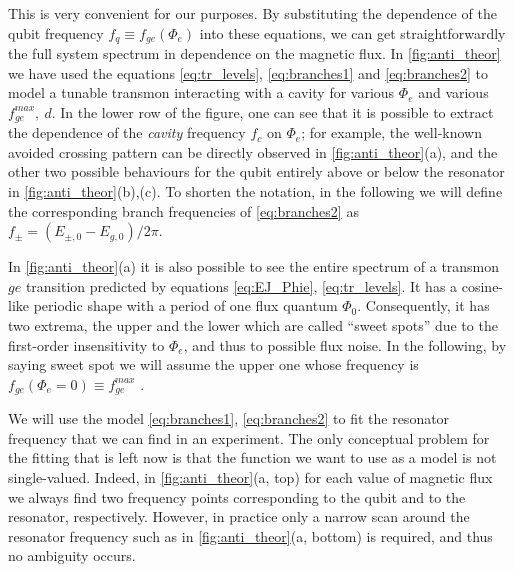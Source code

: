 \documentclass[%
 aip,
 amsmath,amssymb,
 reprint,%
]{revtex4-1}
\begin{document}
This is very convenient for our purposes. By substituting the dependence of the qubit frequency $f_q \equiv f_{ge}(\Phi_e)$ into these equations, we can get straightforwardly the full system spectrum in dependence on the magnetic flux. In \autoref{fig:anti_theor} we have used the equations \eqref{eq:tr_levels}, \eqref{eq:branches1} and \eqref{eq:branches2} to model a tunable transmon interacting with a cavity for various $\Phi_e$ and various $f_{ge}^{max},\ d$. In the lower row of the figure, one can see that it is possible to extract the dependence of the \textit{cavity} frequency $f_c$ on $\Phi_e$; for example, the well-known avoided crossing pattern can be directly observed in \autoref{fig:anti_theor}(a), and the other two possible behaviours for the qubit entirely above or below the resonator in \autoref{fig:anti_theor}(b),(c). To shorten the notation, in the following we will define the corresponding branch frequencies of \eqref{eq:branches2} as $f_{\pm} = ( E_{\pm,0}-E_{g,0})/2\pi$.

In \autoref{fig:anti_theor}(a) it is also possible to see the entire spectrum of a transmon $ge$ transition predicted by equations \eqref{eq:EJ_Phie}, \eqref{eq:tr_levels}. It has a cosine-like periodic shape with a period of one flux quantum $\Phi_0$. Consequently, it has two extrema, the upper and the lower which are called ``sweet spots'' due to the first-order insensitivity to $\Phi_e$, and thus to possible flux noise. In the following, by saying sweet spot we will assume the upper one whose frequency is $f_{ge}(\Phi_e = 0) \equiv f^{max}_{ge}$ .

We will use the model \eqref{eq:branches1}, \eqref{eq:branches2} to fit the resonator frequency that we can find in an experiment. The only conceptual problem for the fitting that is left now is that the function we want to use as a model is not single-valued. Indeed, in \autoref{fig:anti_theor}(a, top) for each value of magnetic flux we always find two frequency points corresponding to the qubit and to the resonator, respectively. However, in practice only a narrow scan around the resonator frequency such as in \autoref{fig:anti_theor}(a, bottom) is required, and thus no ambiguity occurs. 

\end{document}
